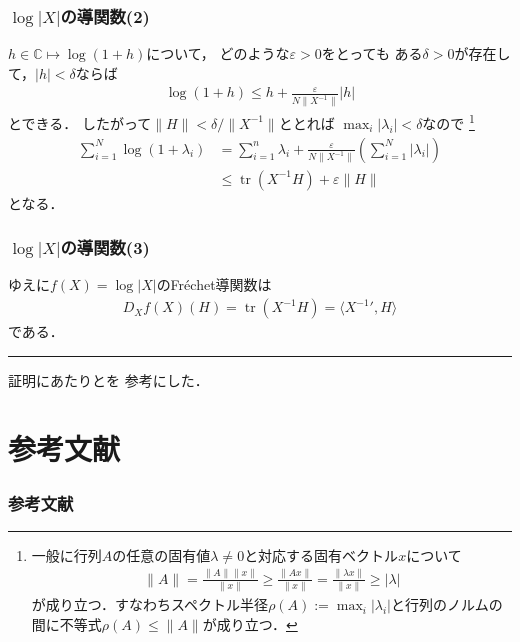 \documentclass[10pt,%
hyperref={unicode}]{beamer}
\DeclareMathOperator*{\tr}{tr}
\begin{document}
\begin{frame}
    \frametitle{$\log |X|$の導関数(2)}
    $h \in \mathbb{C} \mapsto \log (1 + h)$について，
    どのような$\varepsilon > 0$をとっても
    ある$\delta > 0$が存在して，$|h| < \delta$ならば
    \begin{align*}
        \log (1 + h) \leq h + \frac{\varepsilon}{N\|X^{-1}\|} |h|
    \end{align*}
    とできる．
    したがって$\|H\| < \delta /\|X^{-1}\|$ととれば
    $\max_i |\lambda_i| < \delta$なので
    \footnote{一般に行列$A$の任意の固有値$\lambda \neq 0$と対応する固有ベクトル$x$について
    \begin{align*}
        \|A\| = \frac{\|A\|\|x\|}{\|x\|} \geq \frac{\|Ax\|}{\|x\|} = \frac{\|\lambda x\|}{\|x\|} \geq |\lambda|
    \end{align*}
    が成り立つ．すなわちスペクトル半径$\rho(A) := \max_i |\lambda_i|$と行列のノルムの間に不等式$\rho(A) \leq \|A\|$が成り立つ．}
    \begin{align*}
        \sum_{i = 1}^N \log (1 + \lambda_i) &= \sum_{i = 1}^n \lambda_i + \frac{\varepsilon}{N\|X^{-1}\|} \left(\sum_{i = 1}^N |\lambda_i|\right) \\
                                            &\leq \tr (X^{-1}H) + \varepsilon \|H\|
    \end{align*}
    となる．
\end{frame}

\begin{frame}
    \frametitle{$\log |X|$の導関数(3)}
    ゆえに$f(X) = \log |X|$のFréchet導関数は
    \begin{align*}
        D_{X}f(X)(H) = \tr(X^{-1}H) = \langle X^{-1}{}',H\rangle
    \end{align*}
    である．\hfill\rule{5pt}{10pt}

    \bigskip

    証明にあたり\cite{mantonsblog}と\cite{manton2012}を
    参考にした．
\end{frame}

\section{参考文献}
\begin{frame}
    \frametitle{参考文献}
    
    
\end{frame}
\end{document}
